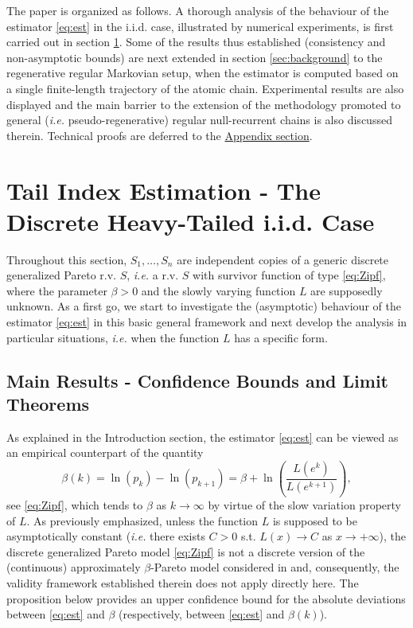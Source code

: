 \documentclass[sn-mathphys-ay]{sn-jnl}%
\begin{document}
The paper is organized as follows. A thorough analysis of the behaviour of the estimator
\eqref{eq:est} in the i.i.d. case, illustrated by numerical experiments, is first carried
out in section \ref{sec:tail-index-estimation}. Some of the results thus established (consistency and non-asymptotic bounds)
are next extended in section \ref{sec:background} to the regenerative regular Markovian
setup, when the estimator is computed based on a single finite-length trajectory of the
atomic chain. Experimental results are also displayed and the main barrier to the
extension of the methodology promoted to general (\textit{i.e.} pseudo-regenerative)
regular null-recurrent chains is also discussed therein. Technical proofs are deferred to
the \hyperref[sec:proofs]{Appendix section}.

\section{Tail Index Estimation - The Discrete Heavy-Tailed i.i.d. Case}\label{sec:tail-index-estimation}

Throughout this section, \(S_1,\ldots,S_n\) are independent copies of a generic discrete
generalized Pareto r.v. $S$, \textit{i.e.} a r.v. $S$ with survivor function of type
\eqref{eq:Zipf}, where the parameter $\beta>0$ and the slowly varying function $L$ are
supposedly unknown. As a first go, we start to investigate the (asymptotic) behaviour of
the estimator \eqref{eq:est} in this basic general framework and next develop the
analysis in particular situations, \textit{i.e.} when the function $L$ has a specific
form.

\subsection{Main Results - Confidence Bounds and Limit Theorems}\label{subsec:main_results}

As explained in the Introduction section, the estimator \eqref{eq:est} can be viewed as
an empirical counterpart of the quantity
\begin{equation}\label{beta_k_eq}
    \beta(k)=\ln(p_k)-\ln(p_{k+1})=\beta+\ln\left(\frac{L(e^{k})}{L(e^{k+1})}\right),
\end{equation}
see \eqref{eq:Zipf}, which tends to $\beta$ as $k\rightarrow \infty$ by virtue of the
slow variation property of $L$. As previously emphasized, unless the function $L$ is
supposed to be asymptotically constant (\textit{i.e.} there exists $C>0$ s.t.
$L(x)\rightarrow C$ as $x\rightarrow +\infty$), the discrete generalized Pareto model
\eqref{eq:Zipf} is not a discrete version of the (continuous) approximately
$\beta$-Pareto model considered in \cite{Carpentier2015} and, consequently, the validity
framework established therein does not apply directly here. The proposition below
provides an upper confidence bound for the absolute deviations between \eqref{eq:est} and
$\beta$ (respectively, between \eqref{eq:est} and $\beta(k)$).
\end{document}
